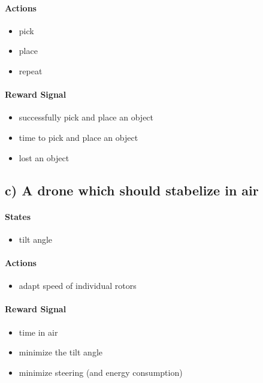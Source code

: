 \documentclass{article}
\begin{document}
\paragraph*{Actions}
\begin{itemize}
    \item pick
    \item place
    \item repeat
\end{itemize}


\paragraph*{Reward Signal}
\begin{itemize}
    \item successfully pick and place an object
    \item time to pick and place an object
    \item lost an object
\end{itemize}




\subsection*{c) A drone which should stabelize in air}

\paragraph*{States}
\begin{itemize}
    \item tilt angle
\end{itemize}

\paragraph*{Actions}
\begin{itemize}
    \item adapt speed of individual rotors
\end{itemize}

\paragraph*{Reward Signal}
\begin{itemize}
    \item time in air
    \item minimize the tilt angle
    \item minimize steering (and energy consumption)
\end{itemize}
\end{document}
